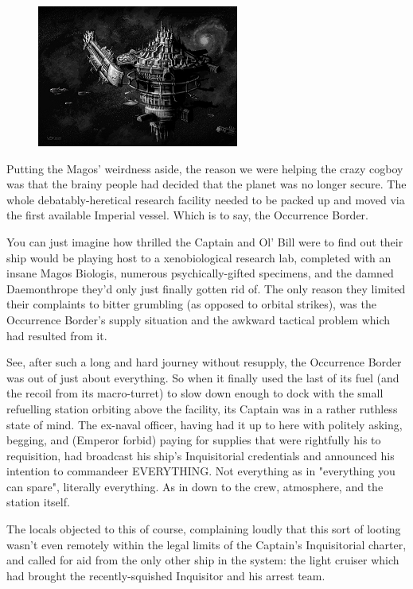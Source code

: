 \begin{figure}
	\begin{center}
		\includegraphics[width=\figwidth]{pics/17/9.png}
	\end{center}
\end{figure}
Putting the Magos' weirdness aside, the reason we were helping the crazy cogboy was that the brainy people had decided that the planet was no longer secure. 
The whole debatably-heretical research facility needed to be packed up and moved via the first available Imperial vessel. 
Which is to say, the Occurrence Border.

You can just imagine how thrilled the Captain and Ol' Bill were to find out their ship would be playing host to a xenobiological research lab, completed with an insane Magos Biologis, numerous psychically-gifted specimens, and the damned Daemonthrope they'd only just finally gotten rid of. 
The only reason they limited their complaints to bitter grumbling (as opposed to orbital strikes), was the Occurrence Border's supply situation and the awkward tactical problem which had resulted from it.

See, after such a long and hard journey without resupply, the Occurrence Border was out of just about everything. 
So when it finally used the last of its fuel (and the recoil from its macro-turret) to slow down enough to dock with the small refuelling station orbiting above the facility, its Captain was in a rather ruthless state of mind. 
The ex-naval officer, having had it up to here with politely asking, begging, and (Emperor forbid) paying for supplies that were rightfully his to requisition, had broadcast his ship's Inquisitorial credentials and announced his intention to commandeer EVERYTHING. 
Not everything as in "everything you can spare", literally everything. 
As in down to the crew, atmosphere, and the station itself.

The locals objected to this of course, complaining loudly that this sort of looting wasn't even remotely within the legal limits of the Captain's Inquisitorial charter, and called for aid from the only other ship in the system: 
the light cruiser which had brought the recently-squished Inquisitor and his arrest team.


